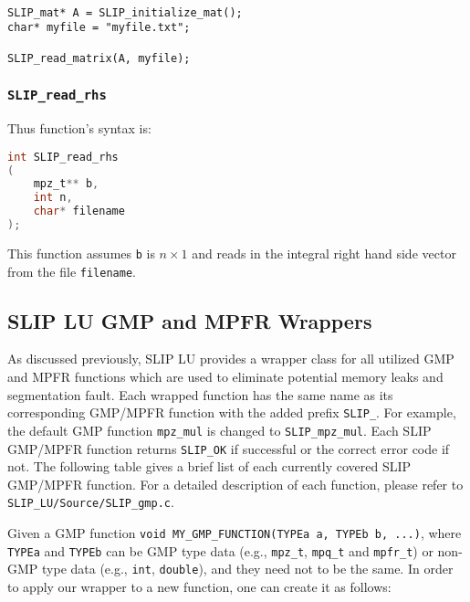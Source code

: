 \documentclass[12pt]{article}
\theoremstyle{definition}
\begin{document}
\begin{verbatim}

SLIP_mat* A = SLIP_initialize_mat();
char* myfile = "myfile.txt";

SLIP_read_matrix(A, myfile);

\end{verbatim}

\cprotect\subsubsection{\verb|SLIP_read_rhs|}

Thus function's syntax is:

\begin{lstlisting}[language=C,frame=single]
int SLIP_read_rhs
(
    mpz_t** b,
    int n,
    char* filename
);
\end{lstlisting}

This function assumes \verb|b| is $n \times 1$ and reads in the integral right hand side vector from the file \verb|filename|.

\newpage

\subsection{SLIP LU GMP and MPFR Wrappers}

As discussed previously, SLIP LU provides a wrapper class for all utilized GMP and MPFR functions which are used to eliminate potential memory leaks and segmentation fault. Each wrapped function has the same name as its corresponding GMP/MPFR function with the added prefix \verb|SLIP_|. For example, the default GMP function \verb|mpz_mul| is changed to \verb|SLIP_mpz_mul|. Each SLIP GMP/MPFR function returns \verb|SLIP_OK| if successful or the correct error code if not. The following table gives a brief list of each currently covered SLIP GMP/MPFR function. For a detailed description of each function, please refer to \verb|SLIP_LU/Source/SLIP_gmp.c|.


Given a GMP function \verb|void MY_GMP_FUNCTION(TYPEa a, TYPEb b, ...)|, where \verb|TYPEa| and \verb|TYPEb| can be GMP type data (e.g., \verb|mpz_t|, \verb|mpq_t| and \verb|mpfr_t|) or non-GMP type data (e.g., \verb|int|, \verb|double|), and they need not to be the same. In order to apply our wrapper to a new function, one can create it as follows:
\end{document}
